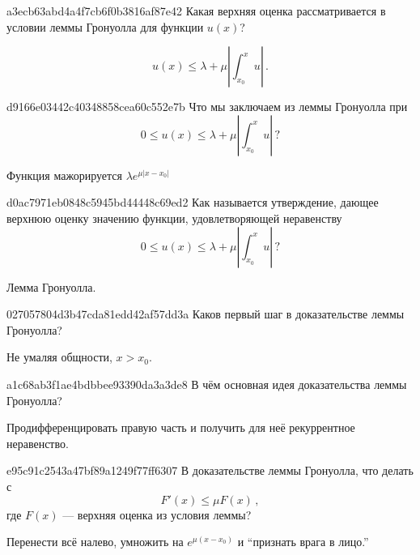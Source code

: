 \begin{note}{a3ecb63abd4a4f7cb6f0b3816af87e42}
    Какая верхняя оценка рассматривается в условии леммы Гронуолла для функции \({ u(x) }\)?

    \begin{cloze}{1}
        \[
            u(x) \leqslant \lambda + \mu \left\lvert \int_{x_0}^{x} u \right\rvert\,.
        \]
    \end{cloze}
\end{note}

\begin{note}{d9166e03442c40348858cea60c552e7b}
    Что мы заключаем из леммы Гронуолла при
    \[
        0 \leqslant u(x) \leqslant \lambda + \mu \left\lvert \int_{x_0}^{x} u \right\rvert\,?
    \]

    \begin{cloze}{1}
        Функция мажорируется \({ \lambda e^{\mu\left\lvert x - x_0 \right\rvert} }\)
    \end{cloze}
\end{note}

\begin{note}{d0ac7971eb0848c5945bd44448c69ed2}
    Как называется утверждение, дающее верхнюю оценку значению функции, удовлетворяющей неравенству
    \[
        0 \leqslant u(x) \leqslant \lambda + \mu \left\lvert \int_{x_0}^{x} u \right\rvert\,?
    \]

    \begin{cloze}{1}
        Лемма Гронуолла.
    \end{cloze}
\end{note}

\begin{note}{027057804d3b47cda81edd42af57dd3a}
    Каков первый шаг в доказательстве леммы Гронуолла?

    \begin{cloze}{1}
        Не умаляя общности, \({ x > x_0 }\).
    \end{cloze}
\end{note}

\begin{note}{a1c68ab3f1ae4bdbbee93390da3a3de8}
    В чём основная идея доказательства леммы Гронуолла?

    \begin{cloze}{1}
        Продифференцировать правую часть и получить для неё рекуррентное неравенство.
    \end{cloze}
\end{note}

\begin{note}{e95c91c2543a47bf89a1249f77ff6307}
    В доказательстве леммы Гронуолла, что делать с
    \[
        F'(x) \leqslant \mu F(x)\,,
    \]
    где \({ F(x) }\) --- верхняя оценка из условия леммы?

    \begin{cloze}{1}
        Перенести всё налево, умножить на \({ e^{\mu(x - x_0)} }\) и ``признать врага в лицо.''
    \end{cloze}
\end{note}

